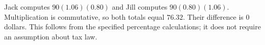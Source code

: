 Jack computes $90(1.06)(0.80)$ and Jill computes $90(0.80)(1.06)$. Multiplication is commutative, so both totals equal $76.32$. Their difference is $\boxed{0}$ dollars. This follows from the specified percentage calculations; it does not require an assumption about tax law.
